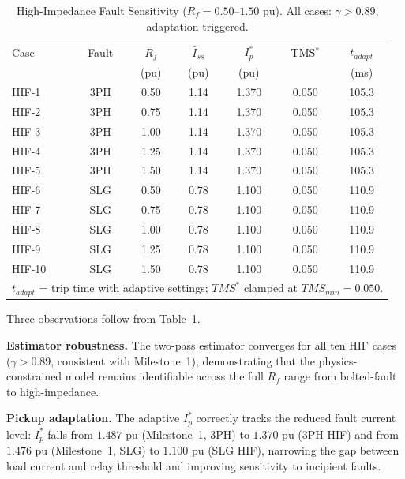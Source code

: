 \documentclass[journal, twoside, 10pt]{IEEEtran}
\newcommand{\pu}{\,\text{pu}}
\begin{document}
\begin{table}[!t]
\caption{High-Impedance Fault Sensitivity ($R_f = 0.50$--$1.50\,\pu$).
         All cases: $\gamma > 0.89$, adaptation triggered.}
\label{tab:hif}
\centering
\setlength{\tabcolsep}{3pt}
\renewcommand{\arraystretch}{1.10}
\begin{tabular}{@{}lcccccc@{}}
\toprule
Case & Fault & $R_f$ & $\hat{I}_{ss}$ & $I_p^*$ & TMS$^*$ & $t_{adapt}$ \\
     &       & (pu)  & (pu)           & (pu)    &         & (ms) \\
\midrule
HIF-1 & 3PH & 0.50 & 1.14 & 1.370 & 0.050 & 105.3 \\
HIF-2 & 3PH & 0.75 & 1.14 & 1.370 & 0.050 & 105.3 \\
HIF-3 & 3PH & 1.00 & 1.14 & 1.370 & 0.050 & 105.3 \\
HIF-4 & 3PH & 1.25 & 1.14 & 1.370 & 0.050 & 105.3 \\
HIF-5 & 3PH & 1.50 & 1.14 & 1.370 & 0.050 & 105.3 \\
\midrule
HIF-6  & SLG & 0.50 & 0.78 & 1.100 & 0.050 & 110.9 \\
HIF-7  & SLG & 0.75 & 0.78 & 1.100 & 0.050 & 110.9 \\
HIF-8  & SLG & 1.00 & 0.78 & 1.100 & 0.050 & 110.9 \\
HIF-9  & SLG & 1.25 & 0.78 & 1.100 & 0.050 & 110.9 \\
HIF-10 & SLG & 1.50 & 0.78 & 1.100 & 0.050 & 110.9 \\
\bottomrule
\multicolumn{7}{l}{\scriptsize $t_{adapt}$ = trip time with adaptive settings; $TMS^*$ clamped
                   at $TMS_{min} = 0.050$.}
\end{tabular}
\end{table}

Three observations follow from Table~\ref{tab:hif}.

\textbf{Estimator robustness.}  The two-pass estimator converges for all
ten HIF cases ($\gamma > 0.89$, consistent with Milestone~1), demonstrating
that the physics-constrained model remains identifiable across the full
$R_f$ range from bolted-fault to high-impedance.

\textbf{Pickup adaptation.}  The adaptive $I_p^*$ correctly tracks the
reduced fault current level: $I_p^*$ falls from $1.487\,\pu$ (Milestone~1,
3PH) to $1.370\,\pu$ (3PH HIF) and from $1.476\,\pu$ (Milestone~1, SLG) to
$1.100\,\pu$ (SLG HIF), narrowing the gap between load current and relay
threshold and improving sensitivity to incipient faults.
\end{document}
